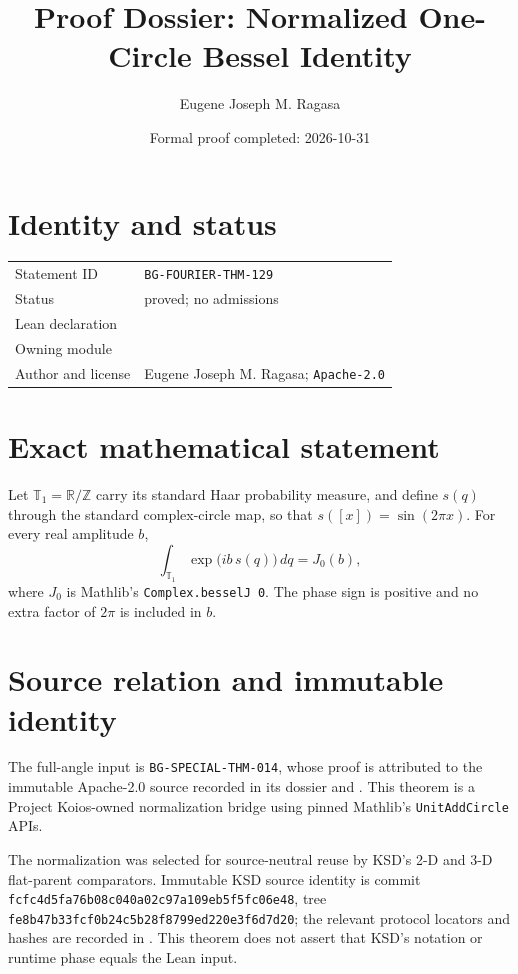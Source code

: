 \documentclass[10pt]{article}
\title{Proof Dossier: Normalized One-Circle Bessel Identity}
\author{Eugene Joseph M. Ragasa}
\date{Formal proof completed: 2026-10-31}
\begin{document}
\raggedright
\maketitle

\section{Identity and status}
\begin{tabularx}{\textwidth}{@{}lY@{}}
\toprule
Statement ID & \texttt{BG-FOURIER-THM-129} \\
Status & proved; no admissions \\
Lean declaration &  \\
Owning module &  \\
Author and license & Eugene Joseph M. Ragasa; \texttt{Apache-2.0} \\
\bottomrule
\end{tabularx}

\section{Exact mathematical statement}
Let $\mathbb T_1=\mathbb R/\mathbb Z$ carry its standard Haar probability measure, and define
$s(q)$ through the standard complex-circle map, so that $s([x])=\sin(2\pi x)$. For every real
amplitude $b$,
\[
  \int_{\mathbb T_1}\exp\!\bigl(i b\,s(q)\bigr)\,dq=J_0(b),
\]
where $J_0$ is Mathlib's \texttt{Complex.besselJ 0}. The phase sign is positive and no extra
factor of $2\pi$ is included in $b$.

\section{Source relation and immutable identity}
The full-angle input is \texttt{BG-SPECIAL-THM-014}, whose proof is attributed to the immutable
Apache-2.0 source recorded in its dossier and . This theorem is a
Project Koios-owned normalization bridge using pinned Mathlib's \texttt{UnitAddCircle} APIs.

The normalization was selected for source-neutral reuse by KSD's 2-D and 3-D flat-parent
comparators. Immutable KSD source identity is commit
\texttt{fcfc4d5fa76b08c040a02c97a109eb5f5fc06e48}, tree
\texttt{fe8b47b33fcf0b24c5b28f8799ed220e3f6d7d20}; the relevant protocol locators and hashes are
recorded in . This theorem does not assert that KSD's notation or runtime
phase equals the Lean input.
\end{document}
